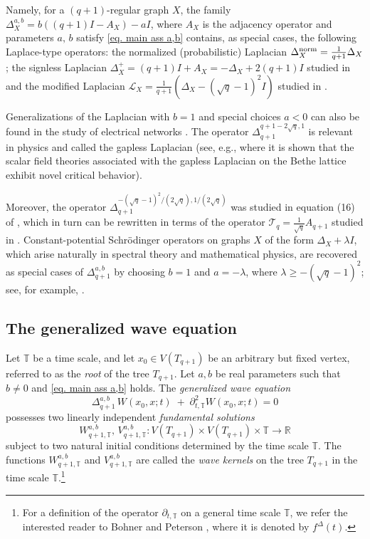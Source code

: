 \documentclass[12pt]{amsart}
\numberwithin{equation}{section}
\theoremstyle{boldremark}
\begin{document}
Namely, for a $(q+1)$-regular graph $X$, the family $\Delta_{X}^{a,b}=b((q+1)I-A_X)-aI$, where $A_X$ is the adjacency operator and parameters $a,\,b$ satisfy \eqref{eq. main ass a,b} contains, as special cases, the following  Laplace-type operators: the normalized (probabilistic) Laplacian $\Delta_X^{\rm norm} = \frac{1}{q+1}\Delta_X$; the signless Laplacian $\Delta_X^{+}=(q+1)I+A_X= -\Delta_X +2(q+1)I$  studied in \cite{CRS07} and the modified Laplacian $\mathcal L_X=\frac{1}{q+1}\left( \Delta_X - (\sqrt{q}-1)^2I\right)$ studied in \cite{MS99}.

Generalizations of the Laplacian with $b=1$ and special choices $a<0$ can also be found in the study of electrical networks \cite{DS-PB18}. The operator $\Delta_{q+1}^{q+1-2\sqrt{q},1}$ is relevant in physics and called the gapless Laplacian (see, e.g., \cite{BDST26} where it is shown that the scalar field theories associated with the gapless Laplacian on the Bethe lattice exhibit novel critical behavior).

Moreover, the operator $\Delta_{q+1}^{-(\sqrt{q}-1)^2/(2\sqrt{q}), 1/(2\sqrt{q})} $ was studied in equation (16) of \cite{AMPS13}, which in turn can be rewritten in terms of the operator $\mathcal{T}_{q}=\frac{1}{\sqrt{q}}A_{q+1}$ studied in \cite{AS19, BL13}. Constant-potential Schrödinger operators on graphs $X$ of the form $\Delta_X+\lambda I$, which arise naturally in spectral theory and mathematical physics, are recovered as special cases of $\Delta_{q+1}^{a,b}$ by choosing $b=1$ and $a=-\lambda$, where $\lambda \geq -(\sqrt{q}-1)^2$; see, for example, \cite{KS14}. 

\subsection{The generalized wave equation} 
Let $\mathbb{T}$ be a time scale, and let $x_0 \in V(T_{q+1})$ be an arbitrary but fixed vertex, referred to as the \textit{root} of the tree $T_{q+1}$. 
Let $a, b$ be real parameters such that $b\neq 0$ and \eqref{eq. main ass a,b} holds.
The \textit{generalized wave equation}
\begin{equation}\label{wave_eq_disc}
\Delta_{q+1}^{a,b}\, W(x_0, x; t)
\;+\;
\partial_{t,\mathbb{T}}^2 W(x_0, x; t)
= 0
\end{equation}
possesses two linearly independent \textit{fundamental solutions}
$$
W_{q+1,\mathbb{T}}^{a,b},\, V_{q+1,\mathbb{T}}^{a,b}: V(T_{q+1}) \times V(T_{q+1}) \times \mathbb{T} \to \mathbb{R}
$$
subject to two natural initial conditions determined by the time scale $\mathbb{T}$. The functions $W_{q+1,\mathbb{T}}^{a,b}$ and $V_{q+1,\mathbb{T}}^{a,b}$ are called the \textit{wave kernels} on the tree $T_{q+1}$ in the time scale $\mathbb{T}$.\footnote{For a definition of the operator $\partial_{t,\mathbb{T}}$ on a general time scale $\mathbb{T}$, we refer the interested reader to Bohner and Peterson \cite{BP1}, where it is denoted by $f^{\Delta}(t)$.}
\end{document}
